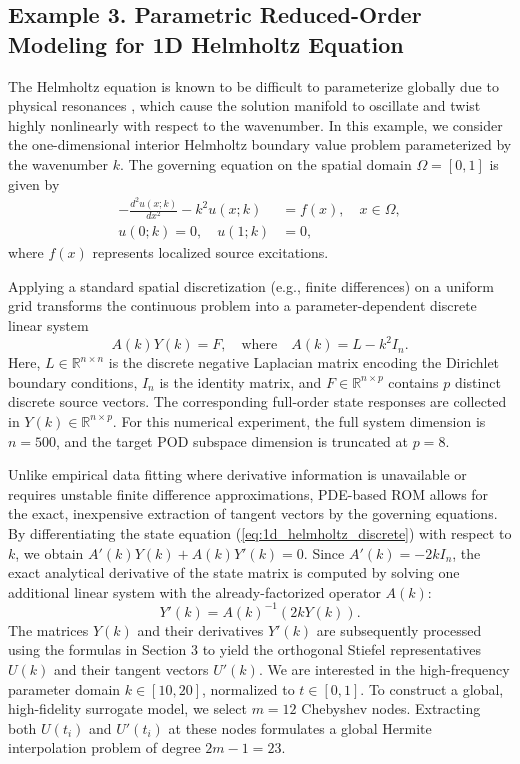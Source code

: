 \documentclass[11pt]{article}
\begin{document}
\subsection*{Example 3. Parametric Reduced-Order Modeling for 1D Helmholtz
Equation }

The Helmholtz equation is known to be difficult to parameterize globally due to physical resonances \cite{ernst2012difficult}, which cause the solution manifold to oscillate and twist highly nonlinearly with respect to the wavenumber. In this example, we consider the one-dimensional interior Helmholtz boundary value problem parameterized by the wavenumber $k$. The governing equation on the spatial domain $\Omega = [0, 1]$ is given by
\begin{align}
    - \frac{d^2 u(x; k)}{dx^2} - k^2 u(x; k) &= f(x), \quad x \in \Omega, \label{eq:1d_helmholtz_pde} \\
    u(0; k) = 0, \quad u(1; k) &= 0, \label{eq:1d_helmholtz_bc}
\end{align}
where $f(x)$ represents localized source excitations. 

Applying a standard spatial discretization (e.g., finite differences) on a uniform grid transforms the continuous problem into a parameter-dependent discrete linear system
\begin{equation} \label{eq:1d_helmholtz_discrete}
    A(k) Y(k) = F, \quad \text{where} \quad A(k) = L - k^2 I_n.
\end{equation}
Here, $L \in \mathbb{R}^{n \times n}$ is the discrete negative Laplacian matrix encoding the Dirichlet boundary conditions, $I_n$ is the identity matrix, and $F \in \mathbb{R}^{n \times p}$ contains $p$ distinct discrete source vectors. The corresponding full-order state responses are collected in $Y(k) \in \mathbb{R}^{n \times p}$. For this numerical experiment, the full system dimension is $n=500$, and the target POD subspace dimension is truncated at $p=8$.
 

Unlike empirical data fitting where derivative information is unavailable or requires unstable finite difference approximations, PDE-based ROM allows for the exact, inexpensive extraction of tangent vectors by the governing equations. By differentiating the state equation (\ref{eq:1d_helmholtz_discrete}) with respect to $k$, we obtain $A'(k)Y(k) + A(k)Y'(k) = 0$. Since $A'(k) = -2k I_n$, the exact analytical derivative of the state matrix is computed by solving one additional linear system with the already-factorized operator $A(k)$:
 $$
Y'(k) = A(k)^{-1} (2k Y(k)).
 $$
The matrices $Y(k)$ and their derivatives $Y'(k)$ are subsequently processed using the formulas in Section 3 to yield the orthogonal Stiefel representatives $U(k)$ and their tangent vectors $U'(k)$.
We are interested in the high-frequency parameter domain $k \in [10, 20]$, normalized to $t \in [0, 1]$. To construct a global, high-fidelity surrogate model, we select $m=12$ Chebyshev nodes. Extracting both $U(t_i)$ and $U'(t_i)$ at these nodes formulates a global Hermite interpolation problem of degree $2m-1 = 23$.
 
\end{document}
